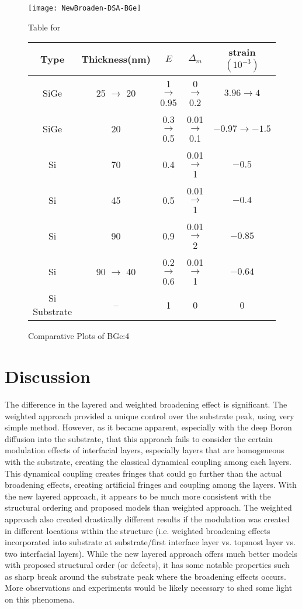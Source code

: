 \begin{figure}[ht]%
\caption{Comparative Plots of BGe:4}
\label{NBGe4:fig}
\begin{minipage}{\linewidth}
\texttt{[image: NewBroaden-DSA-BGe]}
\end{minipage}
\begin{minipage}{\linewidth}
\centering
\vspace{10pt}
Table for \\
\begin{tabular}[htbp]{@{}c|cccc@{}}
    \hline
  Type & Thickness(nm) & $E$ & $\Delta_m$ & strain $(10^{-3})$ \\
    \hline
  SiGe 	& 25  $\rightarrow$ 20& 1  $\rightarrow$ 0.95  & 0  $\rightarrow$ 0.2   & $3.96  \rightarrow 4$  \\
  SiGe 	& 20 & 0.3  $\rightarrow$ 0.5& 0.01  $\rightarrow$0.1& $-0.97 \rightarrow -1.5$  \\
  Si   	& 70 & 0.4 & 0.01  $\rightarrow$ 1& $-0.5		$ \\
  Si 	& 45 & 0.5 & 0.01  $\rightarrow$ 1 & $-0.4		$\\
  Si 	& 90 & 0.9 & 0.01  $\rightarrow$ 2& $-0.85		$\\
  Si 	& 90  $\rightarrow$ 40 & 0.2  $\rightarrow$ 0.6 & 0.01  $\rightarrow$ 1& $-0.64$\\
  Si Substrate & -- & 1 & 0 & 0
  \end{tabular}
\end{minipage}
\end{figure}

	\section{Discussion}

The difference in the layered and weighted broadening effect is significant.  The  weighted approach provided a unique control over the substrate peak, using very simple method.  However, as it became apparent, especially with the deep Boron diffusion into the substrate, that this approach fails to consider the certain modulation effects of interfacial layers, especially layers that are homogeneous with the substrate, creating the classical dynamical coupling among each layers.  This dynamical coupling creates fringes that could go further than the actual broadening effects, creating artificial fringes and coupling among the layers.   With the new layered approach, it appears to be much more consistent with the structural ordering and proposed models than weighted approach.  The weighted approach also created drastically different results if the modulation was created in different locations within the structure (i.e. weighted broadening effects incorporated into substrate at substrate/first interface layer vs. topmost layer vs. two interfacial layers).  While the new layered approach offers much better models with proposed structural order (or defects), it has some notable properties such as sharp break  around the substrate peak where the broadening effects occurs.  More observations and experiments would be likely necessary to shed some light on this phenomena.

